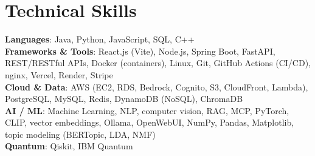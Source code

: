 \documentclass[letterpaper,10pt]{article}
\newcommand{\nk}{\kern0pt}
\begin{document}
\section{Technical Skills}
 \begin{itemize}[leftmargin=0.15in, label={}]
    \small{\item{
     \textbf{Languages}{: Java, Python, JavaScript, SQL, C++} \\
     \textbf{F\nk rameworks \& T\nk ools}{: React.js (Vite), Node.js, Spring Boot, FastAPI, REST/RESTful APIs, Docker (containers), Linux, Git, GitHub Actions (CI/CD), nginx, Vercel, Render, Stripe} \\
     \textbf{Cloud \& Data}{: A\nk WS (EC2, RDS, Bedrock, Cognito, S3, CloudFront, Lambda), PostgreSQL, MySQL, Redis, DynamoDB (NoSQL), ChromaDB} \\
     \textbf{AI / ML}{: Machine Learning, NLP, computer vision, RAG, MCP, PyTorch, CLIP, vector embeddings, Ollama, OpenWebUI, NumPy, Pandas, Matplotlib, topic modeling (BERTopic, LDA, NMF)} \\
     \textbf{Quantum}{: Qiskit, IBM Quantum} \\
    }}
 \end{itemize}

\end{document}
